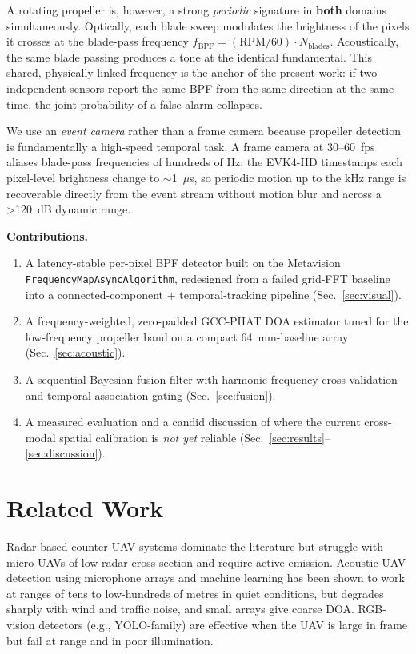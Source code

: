 \documentclass[conference]{IEEEtran}
\begin{document}
A rotating propeller is, however, a strong \emph{periodic} signature in
\textbf{both} domains simultaneously. Optically, each blade sweep modulates
the brightness of the pixels it crosses at the blade-pass frequency
$f_{\mathrm{BPF}} = (\mathrm{RPM}/60)\cdot N_{\text{blades}}$. Acoustically,
the same blade passing produces a tone at the identical fundamental. This
shared, physically-linked frequency is the anchor of the present work: if two
independent sensors report the same BPF from the same direction at the same
time, the joint probability of a false alarm collapses.

We use an \emph{event camera} rather than a frame camera because propeller
detection is fundamentally a high-speed temporal task. A frame camera at
30--60~fps aliases blade-pass frequencies of hundreds of Hz; the EVK4-HD
timestamps each pixel-level brightness change to $\sim$1~$\mu$s, so periodic
motion up to the kHz range is recoverable directly from the event stream
without motion blur and across a \textgreater120~dB dynamic range.

\textbf{Contributions.}
\begin{enumerate}
\item A latency-stable per-pixel BPF detector built on the Metavision
\texttt{FrequencyMapAsyncAlgorithm}, redesigned from a failed grid-FFT baseline
into a connected-component + temporal-tracking pipeline (Sec.~\ref{sec:visual}).
\item A frequency-weighted, zero-padded GCC-PHAT DOA estimator tuned for the
low-frequency propeller band on a compact 64~mm-baseline array
(Sec.~\ref{sec:acoustic}).
\item A sequential Bayesian fusion filter with harmonic frequency
cross-validation and temporal association gating (Sec.~\ref{sec:fusion}).
\item A measured evaluation and a candid discussion of where the current
cross-modal spatial calibration is \emph{not yet} reliable
(Sec.~\ref{sec:results}--\ref{sec:discussion}).
\end{enumerate}

\section{Related Work}
Radar-based counter-UAV systems dominate the literature but struggle with
micro-UAVs of low radar cross-section and require active emission. Acoustic
UAV detection using microphone arrays and machine learning has been shown to
work at ranges of tens to low-hundreds of metres in quiet conditions, but
degrades sharply with wind and traffic noise, and small arrays give coarse
DOA. RGB-vision detectors (e.g., YOLO-family) are effective when the UAV is
large in frame but fail at range and in poor illumination.
\end{document}

